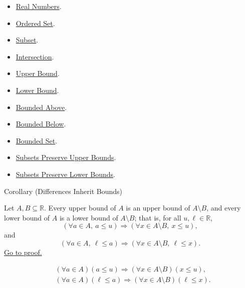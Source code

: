 \begin{dependencies}
\begin{itemize}
\item \hyperref[def:reals]{Real Numbers}.
\item \hyperref[def:ordered-set]{Ordered Set}.
\item \hyperref[def:subset]{Subset}.
\item \hyperref[def:intersection]{Intersection}.
\item \hyperref[def:real-upper-bound]{Upper Bound}.
\item \hyperref[def:real-lower-bound]{Lower Bound}.
\item \hyperref[def:bounded-above]{Bounded Above}.
\item \hyperref[def:bounded-below]{Bounded Below}.
\item \hyperref[def:bounded]{Bounded Set}.
\item \hyperref[lem:subsets-preserve-upper-bounds]{Subsets Preserve Upper Bounds}.
\item \hyperref[lem:subsets-preserve-lower-bounds]{Subsets Preserve Lower Bounds}.
\end{itemize}
\end{dependencies}

\begin{corollarybox}{Corollary (Differences Inherit Bounds)}
\begin{corollary}
\label{cor:differences-inherit-bounds}
Let $A,B\subseteq\mathbb{R}$. Every upper bound of $A$ is an upper bound
of $A\setminus B$, and every lower bound of $A$ is a lower bound of
$A\setminus B$; that is, for all $u,\ell\in\mathbb{R}$,
\[
\left(\forall a\in A,\ a\leq u\right)
\Longrightarrow
(\forall x\in A\setminus B,\ x\leq u),
\]
and
\[
\left(\forall a\in A,\ \ell\leq a\right)
\Longrightarrow
(\forall x\in A\setminus B,\ \ell\leq x).
\]
\hyperref[prf:differences-inherit-bounds]{Go to proof.}
\end{corollary}
\end{corollarybox}

\begin{remark*}
\[
\begin{aligned}
&(\forall a\in A)(a\leq u)
\Longrightarrow(\forall x\in A\setminus B)(x\leq u),\\
&(\forall a\in A)(\ell\leq a)
\Longrightarrow(\forall x\in A\setminus B)(\ell\leq x).
\end{aligned}
\]
\end{remark*}

